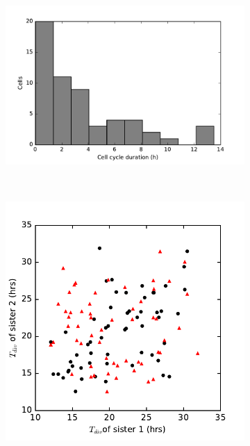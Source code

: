 \documentclass[pdftex,12pt,a4paper]{report}
\begin{document}
\begin{figure}[H]
\centering
\begin{subfigure}{.4\textwidth}
  \centering
  \includegraphics[width=\textwidth]{images/ccd_hist_unsyn.pdf}
  \caption{}
  \label{fig:ccd_hist_unsyn}
\end{subfigure}
~
\begin{subfigure}{.4\textwidth}
  \centering
  \includegraphics[width=\textwidth]{images/ccd_scatter_unsyn.pdf}
  \caption{}
  \label{fig:ccd_scatter_unsyn}
\end{subfigure}


\end{figure}
\end{document}
